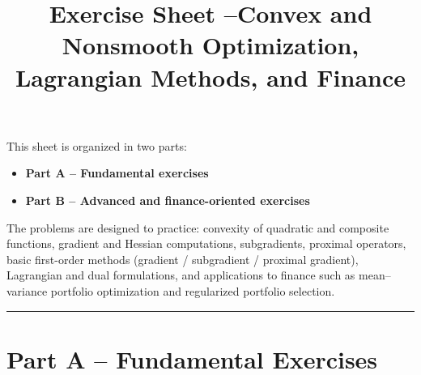 \documentclass[11pt]{article}
\title{Exercise Sheet --Convex and Nonsmooth Optimization, Lagrangian Methods, and Finance\\[0.4em]}
\author{}
\date{}
\begin{document}
\maketitle

This sheet is organized in two parts:
\begin{itemize}
  \item \textbf{Part A -- Fundamental exercises}
  \item \textbf{Part B -- Advanced and finance-oriented exercises}
\end{itemize}

The problems are designed to practice:
convexity of quadratic and composite functions, gradient and Hessian computations,
subgradients, proximal operators, basic first-order methods (gradient / subgradient / proximal gradient),
Lagrangian and dual formulations, and applications to finance such as mean--variance portfolio optimization
and regularized portfolio selection.

\bigskip
\hrule
\bigskip

\section*{Part A -- Fundamental Exercises}
\end{document}
